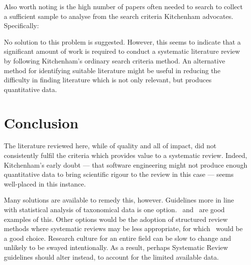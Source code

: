 Also worth noting is the high number of papers often needed to search to collect a sufficient sample to analyse from the search criteria Kitchenham advocates. Specifically:

\begin{table}[h]
\centering
{}
\caption{Papers reviewed to achieve desired samples}
\end{table}

No solution to this problem is suggested. However, this seems to indicate that a significant amount of work is required to conduct a systematic literature review by following Kitchenham's ordinary search criteria method. An alternative method for identifying suitable literature might be useful in reducing the difficulty in finding literature which is not only relevant, but produces quantitative data.\par


\section{Conclusion}

The literature reviewed here, while of quality and all of impact, did not consistently fulfil the criteria which provides value to a systematic review. Indeed, Kitchenham's early doubt --- that software engineering might not produce enough quantitative data to bring scientific rigour to the review in this case --- seems well-placed in this instance.\par

Many solutions are available to remedy this, however. Guidelines more in line with statistical analysis of taxonomical data is one option.~\cite{Kitchenham2013} and~\cite{Kampenes2007} are good examples of this. Other options would be the adoption of structured review methods where systematic reviews may be less appropriate, for which~\cite{Webster2002} would be a good choice. Research culture for an entire field can be slow to change and unlikely to be swayed intentionally. As a result, perhaps Systematic Review guidelines should alter instead, to account for the limited available data.\par


